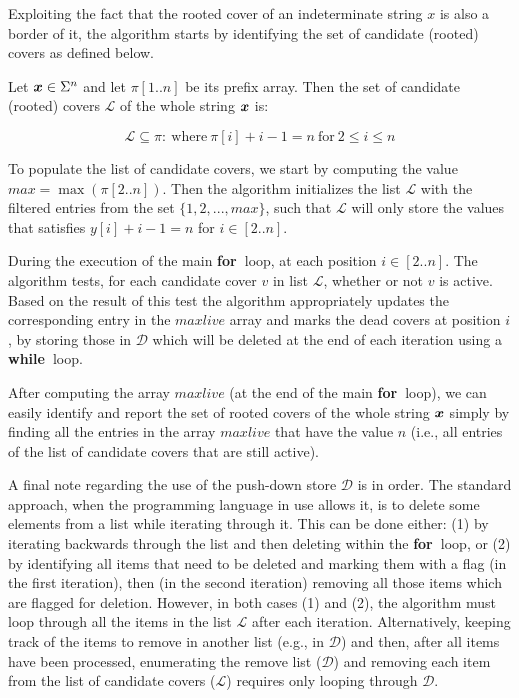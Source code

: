 \documentclass[runningheads,a4paper]{llncs}
\def\s#1{\mbox{\boldmath $#1$}}
\def\bfor{{\bf for\ }}
\def\bwhile{{\bf while\ }}
\begin{document}
Exploiting the fact that the rooted cover of an
indeterminate string \s{x} is also a border of it, the algorithm
starts by identifying the set of candidate (rooted) covers as defined below.
 
\begin{definition}
Let $\s{x} \in \Sigma^n$ and let $\pi[1..n]$ be its prefix array. Then the
set of candidate (rooted) covers $\mathcal L$ of the whole string $\s{x}$ is:

\begin{equation} \label{candidates}
\mathcal L \subseteq \pi: \ \text{where} \  \pi[i] + i-1 = n \
\text{for} \ 2 \le i\le n
\end{equation}
\end{definition}

To populate the list of candidate covers, we start by computing the value
$max = \max(\pi[2..n])$. Then the algorithm initializes the list $\mathcal
L$ with the filtered entries from the set $\{1,2,...,max\}$, such that $\mathcal
L$ will only store the values that satisfies $y[i] + i-1 = n$ for $i \in
[2..n]$.


During the execution of the main \bfor loop, at each position $i \in [2..n]$.
The algorithm tests, for each candidate cover $v$ in list $\mathcal L$, whether
or not $v$ is active.
Based on the result of this test the algorithm appropriately updates the
corresponding entry in the $maxlive$ array and marks the dead covers at position
$i$, by storing those in $\mathcal D$ which will be
deleted at the end of each iteration using a \bwhile loop.

After computing the array $maxlive$ (at the end of the main \bfor loop), we can
easily identify and report the set of rooted covers of the whole string $\s{x}$
simply by finding all the entries in the array $maxlive$ that have the value $n$
(i.e., all entries of the list of candidate covers that are still active).

A final note regarding the use of the push-down store $\mathcal D$ is in
order. The standard approach, when the programming
language in use allows it, is to delete some elements from a list while iterating through it.
This can be done either: (1) by iterating backwards through the list and then
deleting within the \bfor loop, or (2) by identifying all items that need
to be deleted and marking them with a flag (in the first iteration), then (in
the second iteration) removing all those items which are flagged for
deletion. However, in  both cases (1) and (2), the algorithm must loop
through all the items in the list $\mathcal L$ after each iteration.
Alternatively, keeping track of the items to remove in another list (e.g.,
in $\mathcal D$) and then, after all items have been processed, enumerating the
remove list ($\mathcal D$) and removing each item from the list of candidate
covers ($\mathcal L$) requires only looping through $\mathcal
D$. 
\end{document}
